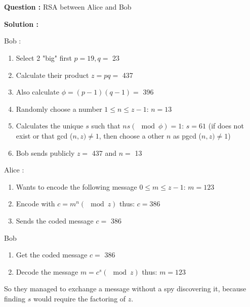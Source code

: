 \documentclass[11pt]{article} %
\newenvironment{question}[1][\unskip]{%
	\par
	\noindent
	\textbf{Question #1:}
	\noindent}
{\medskip}
\newenvironment{solution}[1][\unskip]{%
	\par
	\noindent
	\textbf{Solution #1:}
	\noindent}
{\medskip}
\begin{document}
	\section{}
	\begin{question}
		RSA between Alice and Bob
	\end{question}
	\begin{solution}
		
		Bob :
		\begin{enumerate}
			\item Select 2 "big" first $ p = 19, q = $ 23
			\item Calculate their product $ z = pq = $ 437
			\item Also calculate $ \phi = (p-1) (q-1) = $ 396
			\item Randomly choose a number $ 1 \leq n \leq z-1 $: $ n = 13 $
			\item Calculates the unique $ s $ such that $ ns (\mod \phi) = 1 $: $ s = 61 $ (if does not exist or that gcd ($ n, z) \neq1 $, then choose a other $ n $ as pgcd ($ n, z) \neq1 $)
			\item Bob sends publicly $ z = $ 437 and $ n = $ 13
		\end{enumerate}	
	
		Alice :
		\begin{enumerate}
			\item Wants to encode the following message $ 0 \leq m \leq z-1 $: $ m = 123 $
			\item Encode with $ c = m ^ n (\mod z) $ thus: $ c = 386 $
			\item Sends the coded message $ c = $ 386			
		\end{enumerate}
	
		Bob
		\begin{enumerate}
			\item Get the coded message $ c = $ 386
			\item Decode the message $ m = c ^ s (\mod z) $ thus: $ m = 123 $
		\end{enumerate}
	
		So they managed to exchange a message without a spy discovering it, because finding $ s $ would require the factoring of $ z $.
	\end{solution}

	
\end{document}
